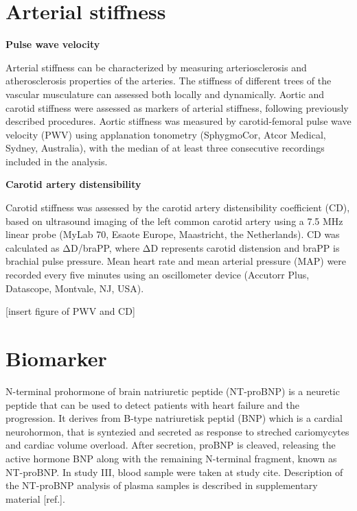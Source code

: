 \documentclass[
  a4paper,
  headsepline=true,
  open=any]{scrbook}
\begin{document}
\hypertarget{arterial-stiffness}{%
\section{Arterial stiffness}\label{arterial-stiffness}}

\textbf{Pulse wave velocity}

Arterial stiffness can be characterized by measuring arteriosclerosis
and atherosclerosis properties of the arteries. The stiffness of
different trees of the vascular musculature can assessed both locally
and dynamically. Aortic and carotid stiffness were assessed as markers
of arterial stiffness, following previously described procedures. Aortic
stiffness was measured by carotid-femoral pulse wave velocity (PWV)
using applanation tonometry (SphygmoCor, Atcor Medical, Sydney,
Australia), with the median of at least three consecutive recordings
included in the analysis.

\textbf{Carotid artery distensibility}

Carotid stiffness was assessed by the carotid artery distensibility
coefficient (CD), based on ultrasound imaging of the left common carotid
artery using a 7.5 MHz linear probe (MyLab 70, Esaote Europe,
Maastricht, the Netherlands). CD was calculated as ΔD/braPP, where ΔD
represents carotid distension and braPP is brachial pulse pressure. Mean
heart rate and mean arterial pressure (MAP) were recorded every five
minutes using an oscillometer device (Accutorr Plus, Datascope,
Montvale, NJ, USA).

{[}insert figure of PWV and CD{]}

\hypertarget{biomarker}{%
\section{Biomarker}\label{biomarker}}

N-terminal prohormone of brain natriuretic peptide (NT-proBNP) is a
neuretic peptide that can be used to detect patients with heart failure
and the progression. It derives from B-type natriuretisk peptid (BNP)
which is a cardial neurohormon, that is syntezied and secreted as
response to streched cariomycytes and cardiac volume overload. After
secretion, proBNP is cleaved, releasing the active hormone BNP along
with the remaining N-terminal fragment, known as NT-proBNP. In study
III, blood sample were taken at study cite. Description of the NT-proBNP
analysis of plasma samples is described in supplementary material
{[}ref.{]}.
\end{document}
